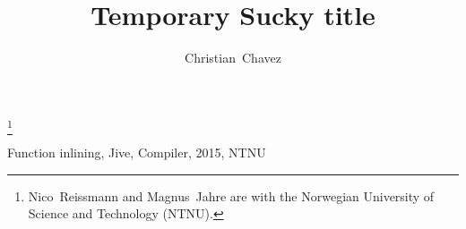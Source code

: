 \documentclass[journal, a4paper, twoside, romanappendices]{IEEEtran}
\begin{document}
\title{Temporary Sucky title}
\author{Christian~Chavez}
\maketitle

\thanks{Nico~Reissmann and Magnus~Jahre are with the Norwegian University of Science and Technology (NTNU).}


\begin{IEEEkeywords}
Function inlining, Jive, Compiler, 2015, NTNU
\end{IEEEkeywords}












\end{document}
